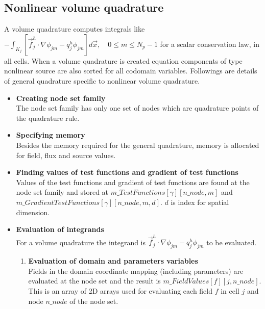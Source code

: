 \documentclass[BoSSSForSolvingConservationLaws.tex]{subfiles}
\begin{document}
\subsection{Nonlinear volume quadrature}
A volume quadrature computes integrals like $-\int_{K_j} [\vec{f}_j^h\cdot \nabla \phi_{jm} - q_j^h \phi_{jm}] d\vec{x}, \quad 0\leq m \leq N_p-1$ for a scalar conservation law, in all cells. When a volume quadrature is created equation components of type nonlinear source are also sorted for all codomain variables. Followings are details of general quadrature specific to nonlinear volume quadrature.
\begin{itemize}
\item \textbf{Creating node set family}\\
The node set family has only one set of nodes which are quadrature points of the quadrature rule.
\item \textbf{Specifying memory}\\
Besides the memory required for the general quadrature, memory is allocated for field, flux and source values.
\item \textbf{Finding values of test functions and gradient of test functions}\\
Values of the test functions and gradient of test functions are found at the node set family and stored at $m\_TestFunctions[\gamma][n\_node, m]$ and\\ $m\_GradientTestFunctions[\gamma][n\_node, m, d]$. $d$ is index for spatial dimension.
\item \textbf{Evaluation of integrands}\\
For a volume quadrature the integrand is $\vec{f}_j^h\cdot \nabla \phi_{jm}-q_j^h \phi_{jm}$ to be evaluated.
\begin{enumerate}
\item \textbf{Evaluation of domain and parameters variables}\\
Fields in the domain coordinate mapping (including parameters) are evaluated at the node set and the result is $m\_FieldValues[f][j,n\_node]$. This is an array of 2D arrays used for evaluating each field $f$ in cell $j$ and node $n\_node$ of the node set.

\end{enumerate}
\end{itemize}
\end{document}
